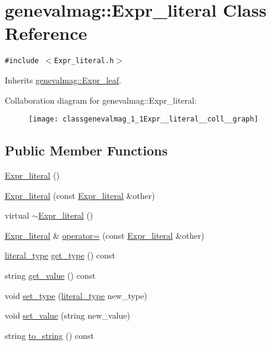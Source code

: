 \hypertarget{classgenevalmag_1_1Expr__literal}{
\section{genevalmag::Expr\_\-literal Class Reference}
\label{classgenevalmag_1_1Expr__literal}
}
{\tt \#include $<$Expr\_\-literal.h$>$}

Inherits \hyperlink{classgenevalmag_1_1Expr__leaf}{genevalmag::Expr\_\-leaf}.

Collaboration diagram for genevalmag::Expr\_\-literal:\nopagebreak
\begin{figure}[H]
\begin{center}
\leavevmode
\texttt{[image: classgenevalmag\_1\_1Expr\_\_literal\_\_coll\_\_graph]}
\end{center}
\end{figure}
\subsection*{Public Member Functions}
\begin{CompactItemize}
\item 
\hyperlink{classgenevalmag_1_1Expr__literal_ad56a6d5a1929c03b3c19ac10f06bf73}{Expr\_\-literal} ()
\item 
\hyperlink{classgenevalmag_1_1Expr__literal_d8dff199ac5faaa7808b24bc6e99aa84}{Expr\_\-literal} (const \hyperlink{classgenevalmag_1_1Expr__literal}{Expr\_\-literal} \&other)
\item 
virtual \hyperlink{classgenevalmag_1_1Expr__literal_faa929f1cd65a7486a29e4d110c73f89}{$\sim$Expr\_\-literal} ()
\item 
\hyperlink{classgenevalmag_1_1Expr__literal}{Expr\_\-literal} \& \hyperlink{classgenevalmag_1_1Expr__literal_76f4c6a1fd0fe094b929d6e01868e0ed}{operator=} (const \hyperlink{classgenevalmag_1_1Expr__literal}{Expr\_\-literal} \&other)
\item 
\hyperlink{namespacegenevalmag_054e5e9167597919bb2fe12ba999fb31}{literal\_\-type} \hyperlink{classgenevalmag_1_1Expr__literal_e821eeb6e591dfe1d8ee62a38367618e}{get\_\-type} () const 
\item 
string \hyperlink{classgenevalmag_1_1Expr__literal_80638840b211284c6d4b4babbe08ce21}{get\_\-value} () const 
\item 
void \hyperlink{classgenevalmag_1_1Expr__literal_6a09dcb9f4c693c55b30ead8b70477fe}{set\_\-type} (\hyperlink{namespacegenevalmag_054e5e9167597919bb2fe12ba999fb31}{literal\_\-type} new\_\-type)
\item 
void \hyperlink{classgenevalmag_1_1Expr__literal_f5e0c53c8df7f902540387c4ff6912e7}{set\_\-value} (string new\_\-value)
\item 
string \hyperlink{classgenevalmag_1_1Expr__literal_2e023f432f0a46b75f65cb0e36ac6583}{to\_\-string} () const 
\end{CompactItemize}
